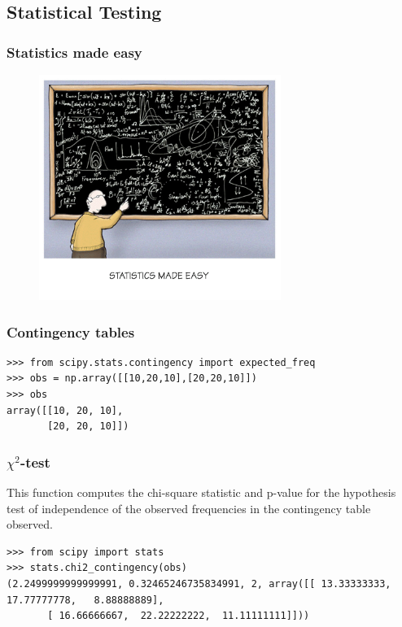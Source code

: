 \documentclass[10pt,colorlinks]{beamer}
\begin{document}

\subsection{Statistical Testing} %
\label{sub:Statistical Testing}

\begin{frame}[fragile]\frametitle{Statistics made easy}
\begin{figure}[!htb]
    \centering
    \includegraphics[width=0.7\textwidth]{figs/statisticsmadeeasy}
\end{figure}
\end{frame}


\begin{frame}[fragile]\frametitle{Contingency tables}
\begin{verbatim}
>>> from scipy.stats.contingency import expected_freq 
>>> obs = np.array([[10,20,10],[20,20,10]])
>>> obs
array([[10, 20, 10],
       [20, 20, 10]])
\end{verbatim}

\end{frame}

\begin{frame}[fragile]\frametitle{$\chi^2$-test}
This function computes the chi-square statistic and p-value for the hypothesis test of independence of the observed frequencies in the contingency table observed. 
\begin{verbatim}
>>> from scipy import stats
>>> stats.chi2_contingency(obs)
(2.2499999999999991, 0.32465246735834991, 2, array([[ 13.33333333,  17.77777778,   8.88888889],
       [ 16.66666667,  22.22222222,  11.11111111]]))
\end{verbatim}


\end{frame}
\end{document}
